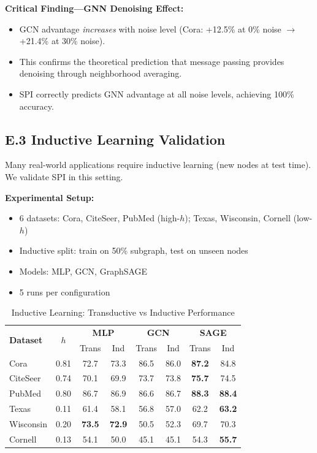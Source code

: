 \textbf{Critical Finding---GNN Denoising Effect:}
\begin{itemize}
    \item GCN advantage \textit{increases} with noise level (Cora: +12.5\% at 0\% noise $\rightarrow$ +21.4\% at 30\% noise).
    \item This confirms the theoretical prediction that message passing provides denoising through neighborhood averaging.
    \item SPI correctly predicts GNN advantage at all noise levels, achieving 100\% accuracy.
\end{itemize}

\subsection*{E.3 Inductive Learning Validation}

Many real-world applications require inductive learning (new nodes at test time). We validate SPI in this setting.

\textbf{Experimental Setup:}
\begin{itemize}
    \item 6 datasets: Cora, CiteSeer, PubMed (high-$h$); Texas, Wisconsin, Cornell (low-$h$)
    \item Inductive split: train on 50\% subgraph, test on unseen nodes
    \item Models: MLP, GCN, GraphSAGE
    \item 5 runs per configuration
\end{itemize}

\begin{table}[h]
\centering
\caption{Inductive Learning: Transductive vs Inductive Performance}
\label{tab:inductive_appendix}
\small
\begin{tabular}{l|c|cc|cc|cc}
\toprule
\multirow{2}{*}{\textbf{Dataset}} & \multirow{2}{*}{\textbf{$h$}} & \multicolumn{2}{c|}{\textbf{MLP}} & \multicolumn{2}{c|}{\textbf{GCN}} & \multicolumn{2}{c}{\textbf{SAGE}} \\
 & & Trans & Ind & Trans & Ind & Trans & Ind \\
\midrule
Cora & 0.81 & 72.7 & 73.3 & 86.5 & 86.0 & \textbf{87.2} & 84.8 \\
CiteSeer & 0.74 & 70.1 & 69.9 & 73.7 & 73.8 & \textbf{75.7} & 74.5 \\
PubMed & 0.80 & 86.7 & 86.9 & 86.6 & 86.7 & \textbf{88.3} & \textbf{88.4} \\
\midrule
Texas & 0.11 & 61.4 & 58.1 & 56.8 & 57.0 & 62.2 & \textbf{63.2} \\
Wisconsin & 0.20 & \textbf{73.5} & \textbf{72.9} & 50.5 & 52.3 & 69.7 & 70.3 \\
Cornell & 0.13 & 54.1 & 50.0 & 45.1 & 45.1 & 54.3 & \textbf{55.7} \\
\bottomrule
\end{tabular}
\end{table}

